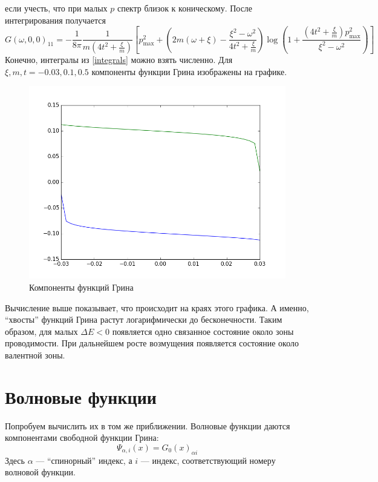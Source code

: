 \documentclass{article}
\begin{document}
если учесть, что при малых $p$ спектр близок к 
коническому. После интегрирования получается
\begin{equation}
    G(\omega,0,0)_{11} = -\frac{1}{8\pi}\frac{1}{m(4t^2 + \frac{\xi}{m})}
        \left[ p_{\mathrm{max}}^2 + 
            \left(2m(\omega+\xi) - \frac{\xi^2 - \omega^2}{4t^2 + \frac{\xi}{m}}\right) 
                \log{\left(1 + \frac{\left(4t^2 + \frac{\xi}{m}\right)p_{\mathrm{max}}^2}
                                    {\xi^2 - \omega^2}\right)}\right]
\end{equation}
Конечно, интегралы из \eqref{integrals} можно взять численно. Для 
$\xi, m, t = -0.03, 0.1, 0.5$ компоненты функции Грина изображены на графике.

\begin{figure}[h]
    \centering
    \includegraphics[width=0.8\linewidth]{green_functions.png}
    \caption{Компоненты функций Грина}
\end{figure}

Вычисление выше показывает, что происходит на краях этого графика. А именно, ``хвосты'' 
функций Грина растут логарифмически до бесконечности.
Таким образом, для малых $\Delta E < 0$ появляется одно связанное состояние около 
зоны проводимости. При дальнейшем росте возмущения появляется состояние около валентной зоны.

\section{Волновые функции}
Попробуем вычислить их в том же приближении. Волновые функции даются компонентами свободной
функции Грина:
\begin{equation}
    \Psi_{\alpha, i}(x) = G_0(x)_{\alpha i}
\end{equation}
Здесь $\alpha$ --- ``спинорный'' индекс, а $i$ --- индекс, соответствующий номеру волновой 
функции.
\end{document}
